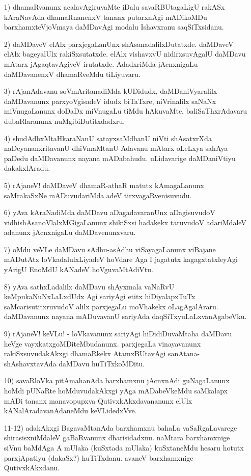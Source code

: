 \begin{itemize}
\item [1)] dhamaRvanunx acalavAgiruvaMte iDalu savaRBUtagaLigU rakASx kAraNavAda dhamaRnanenxV tananx putarxnAgi mADikoMDu barxhamxteVjoVmaya daMDavAgi modalu Ishavxranu saqSiTxsidanu.
\item [2)] daMDaveV elAlx parxjegaLanUnx shAsanadalilxDutatxde. daMDaveV elAlx bageyalUlx rakiSxsutatxde. elAlx vishavxvU nidirxsuvAgalU daMDavu mAtarx jAgaqtavAgiyeV irutatxde. AdadxriMda jAcnxnigaLu daMDavanenxV dhamaRveMdu tiLiyuvaru.
\item [3)] rAjanAdavanu soVmAritanadiMda kUDidudx, daMDaniVyaralilx daMDavanunx parxyoVgisadeV idudx biTaTxre, niVrinalilx saNaNx miVnugaLanunx doDaDx miVnugaLu tiMdu hAkuvaMte, baliSaThxrAdavaru dubaRlaranunx nuMgibiDutitxdadxru.
\item [4)] shudAdhxMtaHkaraNanU satayxsaMdhanU niVti shAsatxrXda naDeyananxritavanU dhiVmaMtanU Adavanu mAtarx oLeLxya sahAya paDedu daMDavanunx nayana mADabahudu. uLidavarige daMDaniVtiyu dakakxlAradu. 
\item [5)] rAjaneV! daMDaveV dhamaR-athaR matutx kAmagaLanunx saMrakaSxNe mADuvudariMda adeV tirxvagaRvenisuvudu.
\item [6)] yAva kAraNadiMda daMDavu aDagadavaranUnx aDagisuvudoV vidhishAsanoVlalxMGigaLanunx shikiSxsi hadakekx taruvudoV adariMdaleV adanunx jAcnxnigaLu daMDavenunxvaru.
\item [7)] oMdu veVLe daMDavu sAdhu-asAdhu viSayagaLanunx viBajane mADutAtx loVkadalulxLiyadeV hoVdare Aga I jagatutx kagagxtatxleyAgi yArigU EnoMdU kANadeV hoVguvaMtAdiVtu.
\item [8)] yAva sathxLadalilx daMDavu shAyxmala vaNaRvU keMpukaNuNxLaLxdUdx Agi sariyAgi etitx hiDiyalapxTuTx saMcarisutitxruvudoV alilx parxjegaLu moVhakekx oLagAgalAraru. daMDavanunx nayana mADuvavanU sariyAda daqSiTxyuLaLxvanAgabeVku.
\item [9)] rAjaneV! keVLu! - loVkavanunx sariyAgi hiDidiDuvaMtaha daMDavu heVge vayxkatxgoMDiteMbudanunx. parxjegaLa vinayavanunx rakiSxsuvudakAkxgi dhamaRkekx AtamxBUtavAgi sanAtana-shAshavxtavAda daMDavu huTiTxkoMDitu.
\item [10)] savaRloVka pitAmahanAda barxhamxnu jAcnxnAdi guNagaLanunx hoMdi pUNaRte hoMduvudakAkxgi yAga mADabeVkeMdu saMkalapx mADi tananx manavopupxva QutivxkAkxdavananunx elUlx kANalAradavanAdaneMdu keVLidedxVve.
\item [11-12)] adakAkxgi BagavaMtanAda barxhamxnu bahaLa vaSaRgaLavarege shirasisxniMdaleV gaBaRvanunx dharisidadxnu. naMtara barxhamxnige siVnu baMdAga A mUlaka (kuSxtada mUlaka) kuSxtaneMdu hesaru hotutx parxjApatiyu (dakaSx?) huTiTxdanu. avaneV barxhamxnige QutivxkAkxdanu.


\end{itemize}
